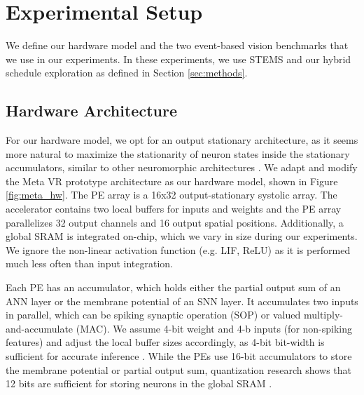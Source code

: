 \section{Experimental Setup} \label{sec:expsetup}

We define our hardware model and the two event-based vision benchmarks that we use in our experiments. In these experiments, we use STEMS and our hybrid schedule exploration as defined in Section \ref{sec:methods}.

\subsection{Hardware Architecture} 


For our hardware model, we opt for an output stationary architecture, as it seems more natural to maximize the stationarity of neuron states inside the stationary accumulators, similar to other neuromorphic architectures \cite{10132492, 9855834}. We adapt and modify the Meta VR prototype architecture \cite{Sumbul2022System-LevelAvatars} as our hardware model, shown in Figure \ref{fig:meta_hw}. The PE array is a 16x32 output-stationary systolic array. The accelerator contains two local buffers for inputs and weights and the PE array parallelizes 32 output channels and 16 output spatial positions. Additionally, a global SRAM is integrated on-chip, which we vary in size during our experiments. We ignore the non-linear activation function (e.g. LIF, ReLU) as it is performed much less often than input integration\cite{zigzag}.

Each PE has an accumulator, which holds either the partial output sum of an ANN layer or the membrane potential of an SNN layer. It accumulates two inputs in parallel, which can be spiking synaptic operation (SOP) or valued multiply-and-accumulate (MAC). We assume 4-bit weight and 4-b inputs (for non-spiking features) and adjust the local buffer sizes accordingly, as 4-bit bit-width is sufficient for accurate inference \cite{9996763, 10.1007/978-3-031-44207-0_34}. While the PEs use 16-bit accumulators to store the membrane potential or partial output sum, quantization research shows that 12 bits are sufficient for storing neurons in the global SRAM \cite{10.1007/978-3-031-44207-0_34}.



